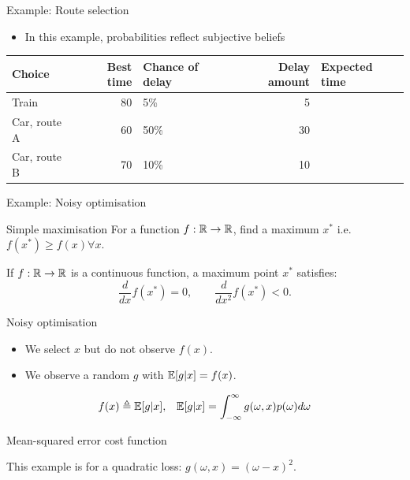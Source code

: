 \documentclass[smaller]{beamer}
\begin{document}
\begin{frame}[label={sec:org6c7e7d3}]{Example: Route selection}
\begin{itemize}
\item In this example, probabilities reflect subjective beliefs
\end{itemize}

\begin{center}
\begin{tabular}{lrlrl}
\hline
Choice & Best time & Chance of delay & Delay amount & Expected time\\
\hline
Train & 80 & 5\% & 5 & \\
Car, route A & 60 & 50\% & 30 & \\
Car, route B & 70 & 10\% & 10 & \\
\hline
\end{tabular}
\end{center}
\end{frame}


\begin{frame}[label={sec:orgb3350f5}]{Example: Noisy optimisation}
\begin{block}{Simple maximisation}
For a function \(f : \mathbb{R} \to \mathbb{R}\), find a maximum \(x^*\) i.e. \(f(x^*) \geq f(x) \forall x\).

\pause
\end{block}
\begin{theorem}
If \(f: \mathbb{R} \to \mathbb{R}\) is a continuous function, a maximum point \(x^*\) satisfies:
\[
\frac{d}{dx} f(x^*) = 0,
\qquad
\frac{d}{dx^2} f(x^*) < 0.
\]

\pause
\end{theorem}
\begin{block}{Noisy optimisation}
\begin{itemize}
\item We select \(x\) but \alert{do not} observe \(f(x)\).
\item We observe a \alert{random} \(g\) with \(\mathop{\mbox{\ensuremath{\mathbb{E}}}}\nolimits[g | x] = f(x)\).
\end{itemize}
\begin{align}
f(x) &\mathrel{\triangleq} \mathop{\mbox{\ensuremath{\mathbb{E}}}}\nolimits[g | x],
&
\mathop{\mbox{\ensuremath{\mathbb{E}}}}\nolimits[g | x] = \int_{- \infty}^\infty g(\omega, x) p(\omega) d\omega
\end{align}
\end{block}
\end{frame}





\begin{frame}[label={sec:org07fe01b}]{Mean-squared error cost function}
This example is for a quadratic loss: \(g(\omega, x) = (\omega - x)^2\).
\end{frame}
\end{document}
